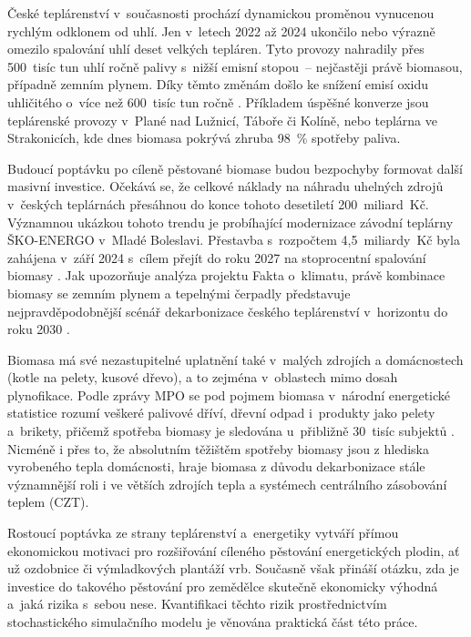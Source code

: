 České teplárenství v~současnosti prochází dynamickou proměnou vynucenou rychlým odklonem od uhlí. Jen v~letech 2022 až 2024 ukončilo nebo výrazně omezilo spalování uhlí deset velkých tepláren. Tyto provozy nahradily přes 500~tisíc tun uhlí ročně palivy s~nižší emisní stopou~-- nejčastěji právě biomasou, případně zemním plynem. Díky těmto změnám došlo ke snížení emisí oxidu uhličitého o~více než 600~tisíc tun ročně \citep{oEnergetice2025}. Příkladem úspěšné konverze jsou teplárenské provozy v~Plané nad Lužnicí, Táboře či Kolíně, nebo teplárna ve Strakonicích, kde dnes biomasa pokrývá zhruba 98~\% spotřeby paliva.
 
Budoucí poptávku po cíleně pěstované biomase budou bezpochyby formovat další masivní investice. Očekává se, že celkové náklady na náhradu uhelných zdrojů v~českých teplárnách přesáhnou do konce tohoto desetiletí 200~miliard~Kč. Významnou ukázkou tohoto trendu je probíhající modernizace závodní teplárny ŠKO-ENERGO v~Mladé Boleslavi. Přestavba s~rozpočtem 4{,}5~miliardy~Kč byla zahájena v~září 2024 s~cílem přejít do roku 2027 na stoprocentní spalování biomasy \citep{oEnergetice2025}. Jak upozorňuje analýza projektu Fakta o~klimatu, právě kombinace biomasy se zemním plynem a tepelnými čerpadly představuje nejpravděpodobnější scénář dekarbonizace českého teplárenství v~horizontu do roku 2030 \citep{FaktaOKlimatu2025}.
 
Biomasa má své nezastupitelné uplatnění také v~malých zdrojích a domácnostech (kotle na pelety, kusové dřevo), a to zejména v~oblastech mimo dosah plynofikace. Podle zprávy MPO se pod pojmem biomasa v~národní energetické statistice rozumí veškeré palivové dříví, dřevní odpad i~produkty jako pelety a~brikety, přičemž spotřeba biomasy je sledována u~přibližně 30~tisíc subjektů \citep{MPO2024oze}. Nicméně i přes to, že absolutním těžištěm spotřeby biomasy jsou z hlediska vyrobeného tepla domácnosti, hraje biomasa z důvodu dekarbonizace stále významnější roli i ve větších zdrojích tepla a systémech centrálního zásobování teplem (CZT).
 
Rostoucí poptávka ze strany teplárenství a~energetiky vytváří přímou ekonomickou motivaci pro rozšiřování cíleného pěstování energetických plodin, ať už ozdobnice či výmladkových plantáží vrb. Současně však přináší otázku, zda je investice do takového pěstování pro zemědělce skutečně ekonomicky výhodná a~jaká rizika s~sebou nese. Kvantifikaci těchto rizik prostřednictvím stochastického simulačního modelu je věnována praktická část této práce.